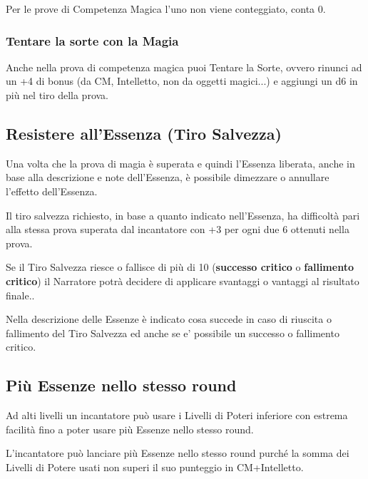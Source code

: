 \documentclass[a4paper,11pt,twoside,openany]{book}
\begin{document}
Per le prove di Competenza Magica l'uno non viene conteggiato, conta 0.

\subsubsection{Tentare la sorte con la Magia}

\label{tentare-la-sorte-con-la-magia}

Anche nella prova di competenza magica puoi Tentare la Sorte, ovvero rinunci ad un +4 di bonus (da CM, Intelletto, non da oggetti magici...) e aggiungi un d6 in più nel tiro della prova.

\subsection{Resistere all'Essenza (Tiro Salvezza)}

\label{resistere-allessenza-tiro-salvezza}

Una volta che la prova di magia è superata e quindi l'Essenza liberata, anche in base alla descrizione e note dell'Essenza, è possibile dimezzare o annullare l'effetto dell'Essenza.

Il tiro salvezza richiesto, in base a quanto indicato nell'Essenza, ha difficoltà pari alla stessa prova superata dal incantatore con +3 per ogni due 6 ottenuti nella prova.

Se il Tiro Salvezza riesce o fallisce di più di 10 (\textbf{successo critico} o \textbf{fallimento critico}) il Narratore potrà decidere di applicare svantaggi o vantaggi al risultato finale..

Nella descrizione delle Essenze è indicato cosa succede in caso di riuscita o fallimento del Tiro Salvezza ed anche se e' possibile un successo o fallimento critico.

\subsection{Più Essenze nello stesso round}

Ad alti livelli un incantatore può usare i Livelli di Poteri inferiore con estrema facilità fino a poter usare più Essenze nello stesso round.

L'incantatore può lanciare più Essenze nello stesso round purché la somma dei Livelli di Potere usati non superi il suo punteggio in CM+Intelletto.
\end{document}
